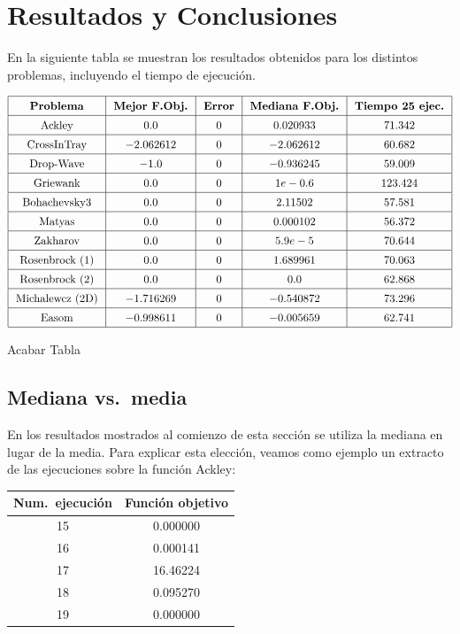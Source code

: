 \documentclass{article}
\begin{document}
\section{Resultados y Conclusiones}
En la siguiente tabla se muestran los resultados obtenidos para los distintos problemas, incluyendo el tiempo de ejecución.

\[\arraycolsep=7pt\def\arraystretch{1.4}
\begin{array}{|c|c|c|c|c|}
\hline
\text{\textbf{Problema}} & \text{\textbf{Mejor F.Obj.}} & \text{\textbf{Error}} & \text{\textbf{Mediana F.Obj.}} & \text{\textbf{Tiempo 25 ejec.}} \\ \hline
\text{Ackley} & 0.0 & 0 & 0.020933 & 71.342 \\ \hline
\text{CrossInTray} & -2.062612 & 0 & -2.062612 & 60.682 \\ \hline
\text{Drop-Wave} & -1.0 & 0 & -0.936245 & 59.009 \\ \hline
\text{Griewank} & 0.0 & 0 & 1e-0.6 & 123.424 \\ \hline
\text{Bohachevsky3} & 0.0 & 0 & 2.11502 & 57.581 \\ \hline
\text{Matyas} & 0.0 & 0 & 0.000102 & 56.372 \\ \hline
\text{Zakharov} & 0.0 & 0 & 5.9e-5 & 70.644 \\ \hline
\text{Rosenbrock (1)} & 0.0 & 0 & 1.689961 & 70.063 \\ \hline
\text{Rosenbrock (2)} & 0.0 & 0 & 0.0 & 62.868 \\ \hline
\text{Michalewcz (2D)} & -1.716269 & 0 & -0.540872 & 73.296 \\ \hline
\text{Easom} & -0.998611 & 0 & -0.005659 & 62.741 \\ \hline
\end{array}\]

Acabar Tabla

\subsection{Mediana vs.\ media}
En los resultados mostrados al comienzo de esta sección se utiliza la mediana en lugar de la media. Para explicar esta elección, veamos como ejemplo un extracto de las ejecuciones sobre la función Ackley:
\begin{table}[hb]
\centering
\begin{tabular}{cc}
    Num.\ ejecución & Función objetivo\\\toprule
    15&0.000000\\
    16&0.000141\\
    17&16.46224\\
    18&0.095270\\
    19&0.000000\\
\end{tabular}
\end{table}
\end{document}

